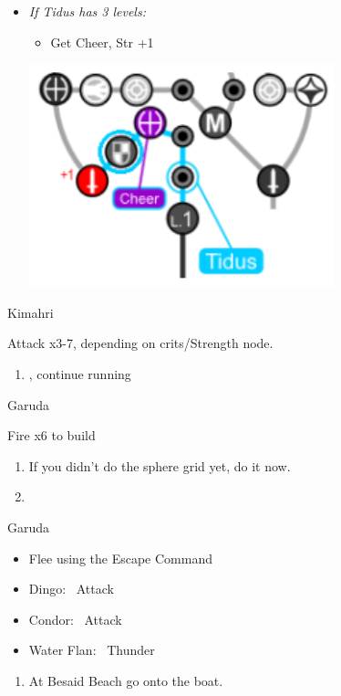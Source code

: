 \begin{spheregrid}
	\begin{itemize}
	\item \textit{If Tidus has 3 levels:}
	\begin{itemize}
		\item Get Cheer, Str +1
	\end{itemize}
	\includegraphics{graphics/tiduscheer}
	\end{itemize}
\end{spheregrid}
\begin{battle}[750]{Kimahri}
\begin{itemize}
	\tidusf Attack x3-7, depending on crits/Strength node.
\end{itemize}
\end{battle}
\begin{enumerate}[resume]
	\item \sd, continue running
\end{enumerate}
\begin{battle}{Garuda}
	\begin{itemize}
		\summon{\valefor}
		\valeforf Fire x6 to build \od
	\end{itemize}
\end{battle}
\begin{enumerate}[resume]
	\item If you didn't do the sphere grid yet, do it now.
	\item \formation{\tidus}{\yuna}{\lulu}
\end{enumerate}
\begin{battle}{Garuda}
	\begin{itemize}
		\item Flee using the Escape Command
	\end{itemize}
\end{battle}
\begin{encounters}
	\begin{itemize}
		\item Dingo: \tidus\ Attack
		\item Condor: \wakka\ Attack
		\item Water Flan: \lulu\ Thunder
	\end{itemize}
\end{encounters}
\begin{enumerate}[resume]
	\item At Besaid Beach go onto the boat.
\end{enumerate}
